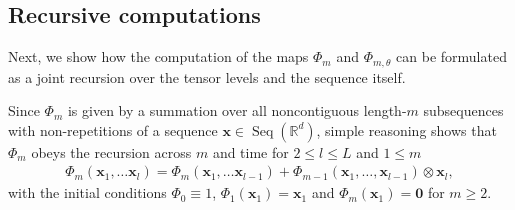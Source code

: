 \documentclass{article} \usepackage{iclr2021_conference,times}
\newcommand{\R}{\mathbb{R}}
\newcommand{\bx}{\mathbf{x}}
\newcommand{\Seq}[1]{\operatorname{Seq}(#1)}
\theoremstyle{plain}
\theoremstyle{definition}
\begin{document}
		


















		






















			
























\subsection{Recursive computations} \label{app:recursive}
Next, we show how the computation of the maps $\Phi_m$ and $\Phi_{m, \theta}$ can be formulated as a joint recursion over the tensor levels and the sequence itself. 

Since $\Phi_m$ is given by a summation over all noncontiguous length-$m$ subsequences with non-repetitions of a sequence $\bx \in \Seq{\R^d}$, simple reasoning shows that $\Phi_m$ obeys the recursion across $m$ and time for $2 \leq l \leq L$ and $1 \leq m$
\begin{align} \label{eq:recursive_Seq2Tens}
    \Phi_m(\bx_1, \dots \bx_l) = \Phi_m(\bx_1, \dots \bx_{l-1}) + \Phi_{m-1}(\bx_1, \dots, \bx_{l-1}) \otimes \bx_{l},
\end{align}
with the initial conditions $\Phi_0 \equiv 1$, $\Phi_1(\bx_1) = \bx_1$ and $\Phi_m(\bx_1) = \mathbf{0}$ for $m \geq 2$.
\end{document}
